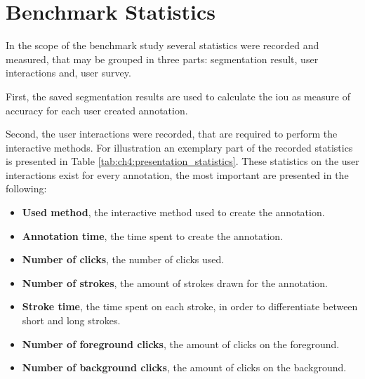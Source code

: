 
\section{Benchmark Statistics}\label{ord:ch4:sec3}

In the scope of the benchmark study several statistics were recorded and measured, that may be grouped in three parts: segmentation result, user interactions and, user survey.

First, the saved segmentation results are used to calculate the \gls{iou} as measure of accuracy for each user created annotation.

Second, the user interactions were recorded, that are required to perform the interactive methods.
For illustration an exemplary part of the recorded statistics is presented in Table \ref{tab:ch4:presentation_statistics}.
These statistics on the user interactions exist for every annotation, the most important are presented in the following:
\begin{itemize}
	\item \textbf{Used method}, the interactive method used to create the annotation.
	\item \textbf{Annotation time}, the time spent to create the annotation.
	\item \textbf{Number of clicks}, the number of clicks used.
	\item \textbf{Number of strokes}, the amount of strokes drawn for the annotation.
	\item \textbf{Stroke time}, the time spent on each stroke, in order to differentiate between short and long strokes.
	\item \textbf{Number of foreground clicks}, the amount of clicks on the foreground.
	\item \textbf{Number of background clicks}, the amount of clicks on the background.
	
	\begin{comment}
	\end{comment}	
\end{itemize}

